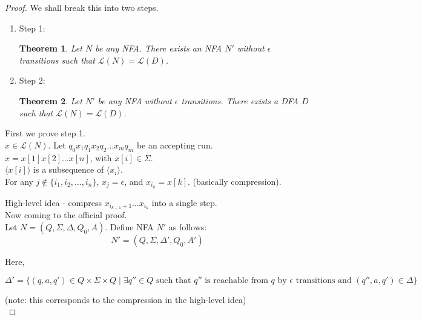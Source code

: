 \documentclass[a4paper]{article}
\newtheorem{theorem}{Theorem}[section]
\newcommand{\mc}{\mathcal}
\begin{document}
\begin{proof}

    We shall break this into two steps.

    \begin{enumerate}
        \item Step 1:
            \begin{theorem}
                Let $N$ be any NFA. There exists an NFA $N'$ without $\epsilon$ transitions such that $\mc{L}(N) = \mc{L}(D)$.
            \end{theorem}
        \item Step 2:
            \begin{theorem}
                Let $N'$ be any NFA without $\epsilon$ transitions. There exists a DFA $D$ such that $\mc{L}(N) = \mc{L}(D)$.
            \end{theorem}
    \end{enumerate}

    First we prove step 1.\\

    $x \in \mc{L}(N)$. Let $q_0 x_1 q_1 x_2 q_2 \ldots x_m q_m$ be an accepting run.\\

    $x = x[1] x[2] \ldots x[n]$, with $x[i] \in \Sigma$.\\

    $\langle x[i] \rangle$ is a subsequence of $\langle x_i \rangle$.\\

    For any $j \not \in \{i_1, i_2, \ldots, i_n\}$, $x_j = \epsilon$, and $x_{i_k} = x[k]$. (basically compression).

    High-level idea - compress $x_{i_{k - 1} + 1} \ldots x_{i_k}$ into a single step.\\

    Now coming to the official proof.\\

    Let $N = (Q, \Sigma, \Delta, Q_0, A)$. Define NFA $N'$ as follows:\\

    $$N' = (Q, \Sigma, \Delta', Q_0, A')$$

    Here, 

    $$\Delta' = \{(q, a, q') \in Q \times \Sigma \times Q \mid \exists q'' \in Q \text{ such that } q''  \text{ is reachable from } q \text{ by } \epsilon \text{ transitions and } (q'', a, q') \in \Delta \}$$

    (note: this corresponds to the compression in the high-level idea)\\


\end{proof}
\end{document}
